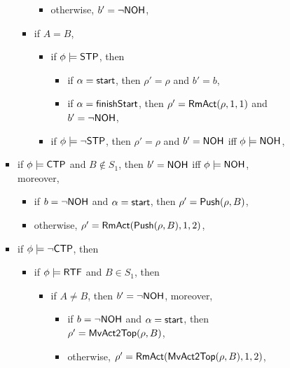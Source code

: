 \begin{itemize}
\begin{itemize}
\begin{itemize}
\begin{itemize}
\begin{itemize}
\begin{itemize}
\begin{itemize}
						\item otherwise, $b' = \neg {\sf NOH}$, 
					\end{itemize}
					\item if $A = B$, 
					\begin{itemize}
						\item if $\phi \models {\sf STP}$, then
						\begin{itemize}
							\item if $\alpha = {\mathsf{start} }$, then $\rho' = \rho$ and $b' = b$,
							\item if $\alpha = {\mathsf{finishStart} }$, then $\rho' = \mathsf{RmAct}(\rho, 1, 1)$ and $b' = \neg {\sf NOH}$,
						\end{itemize}
						\item if $\phi \models \neg {\sf STP}$, then $\rho' = \rho$ and $b' = {\sf NOH}$ iff $\phi \models {\sf NOH}$,
					\end{itemize}
				\end{itemize}
				\item if $\phi \models {\sf CTP}$ and $B\notin S_1$, then $b' = {\sf NOH}$ iff $\phi \models {\sf NOH}$, moreover,
				\begin{itemize}
					\item if $b = \neg {\sf NOH}$ and $\alpha = {\mathsf{start} }$, then $\rho'=\mathsf{Push}(\rho, B)$,
					\item otherwise, $\rho' = \mathsf{RmAct}(\mathsf{Push}(\rho, B), 1, 2)$, 
				\end{itemize}
				\item if $\phi \models \neg {\sf CTP}$, then
				\begin{itemize}
					\item if $\phi \models {\sf RTF}$ and $B \in S_1$, then
					\begin{itemize}
                					\item if $A \neq B$, then $b' = \neg {\sf NOH}$, moreover, 
                					\begin{itemize}
                						\item if $b = \neg {\sf NOH}$ and $\alpha = {\mathsf{start} }$, then $\rho'=\mathsf{MvAct2Top}(\rho, B)$,
							\item otherwise, $\rho' = \mathsf{RmAct}(\mathsf{MvAct2Top}(\rho, B), 1, 2)$,
						\end{itemize}

\end{itemize}
\end{itemize}
\end{itemize}
\end{itemize}
\end{itemize}
\end{itemize}
\end{itemize}
